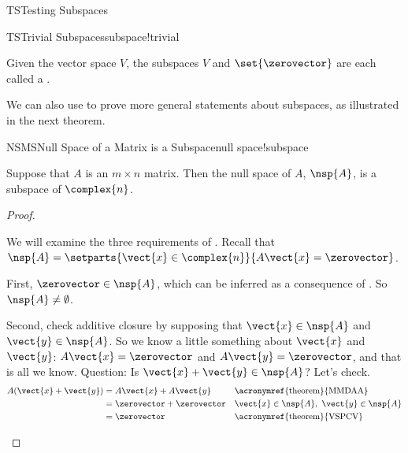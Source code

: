 \begin{subsect}{TS}{Testing Subspaces}
%
\begin{definition}{TS}{Trivial Subspaces}{subspace!trivial}
\begin{para}Given the vector space $V$, the subspaces $V$ and $\set{\zerovector}$ are each called a .\end{para}
\end{definition}
%
\begin{para}We can also use  to prove more general statements about subspaces, as illustrated in the next theorem.\end{para}
%
\begin{theorem}{NSMS}{Null Space of a Matrix is a Subspace}{null space!subspace}
\begin{para}Suppose that $A$ is an $m\times n$ matrix.  Then the null space of $A$, $\nsp{A}$, is a subspace of $\complex{n}$.\end{para}
\end{theorem}
%
\begin{proof}
\begin{para}We will examine the three requirements of .  Recall that $\nsp{A}=\setparts{\vect{x}\in\complex{n}}{A\vect{x}=\zerovector}$.\end{para}
%
\begin{para}First, $\zerovector\in\nsp{A}$, which can be inferred as a consequence of .  So $\nsp{A}\neq\emptyset$.\end{para}
%
\begin{para}Second, check additive closure by supposing that $\vect{x}\in\nsp{A}$ and $\vect{y}\in\nsp{A}$.  So we know a little something about $\vect{x}$ and $\vect{y}$:  $A\vect{x}=\zerovector$ and $A\vect{y}=\zerovector$, and that is all we know.  Question:  Is $\vect{x}+\vect{y}\in\nsp{A}$?  Let's check.
%
\begin{align*}
A(\vect{x}+\vect{y})&=A\vect{x}+A\vect{y}&&\text{\acronymref{theorem}{MMDAA}}\\
&=\zerovector+\zerovector&&\vect{x}\in\nsp{A},\ \vect{y}\in\nsp{A}\\
&=\zerovector&&\text{\acronymref{theorem}{VSPCV}}
\end{align*}


\end{para}
\end{proof}
\end{subsect}
